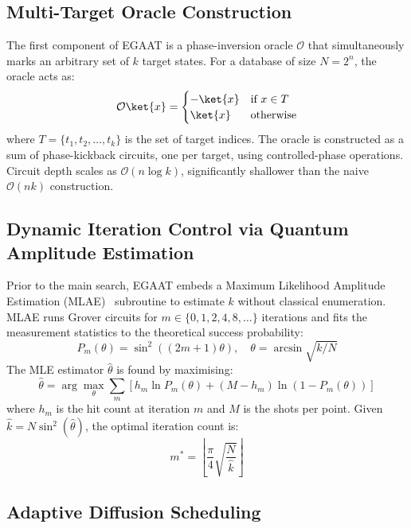 \subsection{Multi-Target Oracle Construction}

The first component of EGAAT is a phase-inversion oracle $\mathcal{O}$ that
simultaneously marks an arbitrary set of $k$ target states. For a database of
size $N = 2^n$, the oracle acts as:
\begin{equation}
  \mathcal{O}\ket{x} = \begin{cases} -\ket{x} & \text{if } x \in T \\ \ket{x} & \text{otherwise} \end{cases}
\end{equation}
where $T = \{t_1, t_2, \ldots, t_k\}$ is the set of target indices. The oracle
is constructed as a sum of phase-kickback circuits, one per target, using
controlled-phase operations. Circuit depth scales as $\mathcal{O}(n \log k)$,
significantly shallower than the naive $\mathcal{O}(nk)$ construction.

\subsection{Dynamic Iteration Control via Quantum Amplitude Estimation}

Prior to the main search, EGAAT embeds a Maximum Likelihood Amplitude Estimation
(MLAE)~\cite{Suzuki2020} subroutine to estimate $k$ without classical enumeration.
MLAE runs Grover circuits for $m \in \{0, 1, 2, 4, 8, \ldots\}$ iterations and
fits the measurement statistics to the theoretical success probability:
\begin{equation}
  P_m(\theta) = \sin^2\!\left((2m+1)\theta\right), \quad \theta = \arcsin\!\sqrt{k/N}
\end{equation}
The MLE estimator $\hat{\theta}$ is found by maximising:
\begin{equation}
  \hat{\theta} = \arg\max_\theta \sum_m \left[ h_m \ln P_m(\theta) + (M-h_m)\ln(1-P_m(\theta)) \right]
\end{equation}
where $h_m$ is the hit count at iteration $m$ and $M$ is the shots per point.
Given $\hat{k} = N\sin^2(\hat{\theta})$, the optimal iteration count is:
\begin{equation}
  m^* = \left\lfloor \frac{\pi}{4} \sqrt{\frac{N}{\hat{k}}} \right\rfloor
\end{equation}

\subsection{Adaptive Diffusion Scheduling}

